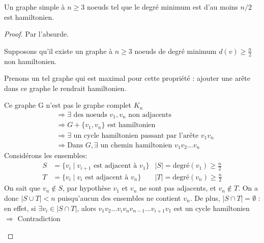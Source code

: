 \begin{mytheo} 
  Un graphe simple à $n \geq 3$ noeuds tel que le degré minimum est d’au moins $n/2$ est hamiltonien.
  \begin{proof}
     Par l'absurde.

     Supposons qu'il existe un graphe à $n \geq 3$ noeuds de degré minimum $d(v) \geq \frac{n}{2}$ non hamiltonien.

     Prenons un tel graphe qui est maximal pour cette propriété : ajouter une arête dans ce graphe le rendrait hamiltonien.

     Ce graphe G n'est pas le graphe complet $K_n$
     \begin{align*}
		&\Rightarrow \exists \text{ des noeuds } v_1, v_n \text{ non adjacents} \\
		&\Rightarrow G + \{v_1, v_n \} \text{ est hamiltonien} \\
		&\Rightarrow \exists \text{ un cycle hamiltonien passant par l'arête } v_1v_n \\
		&\Rightarrow \text{Dans } G, \exists \text{ un chemin hamiltonien } v_1v_2...v_n
	\end{align*}
	Considérons les ensembles:
	\begin{align*}
		S &= \{v_i \mid v_{i+1} \text{ est adjacent à } v_1\} &\vert S \vert = \text{degré}(v_1) \geq \frac{n}{2}\\
		T &= \{v_i \mid v_{i} \text{ est adjacent à } v_n\} &\vert T \vert = \text{degré}(v_n) \geq \frac{n}{2}
	\end{align*}
	On sait que $v_n \not\in S$, par hypothèse $v_1$ et $v_n$ ne sont pas adjacents, et $v_n \not\in T$. On a donc $\vert S \cup T \vert < n$ puisqu'aucun des ensembles ne contient $v_n$.
	De plus, $\vert S \cap T \vert = \emptyset $ : en effet, si $\exists v_i \in \vert S \cap T \vert$, alors $v_1v_2...v_iv_nv_{n-1}...v_{i+1}v_1$ est un cycle hamiltonien $\Rightarrow$ Contradiction
	\begin{figure} [!h]
		\center
\end{figure}
\end{proof}
\end{mytheo}
